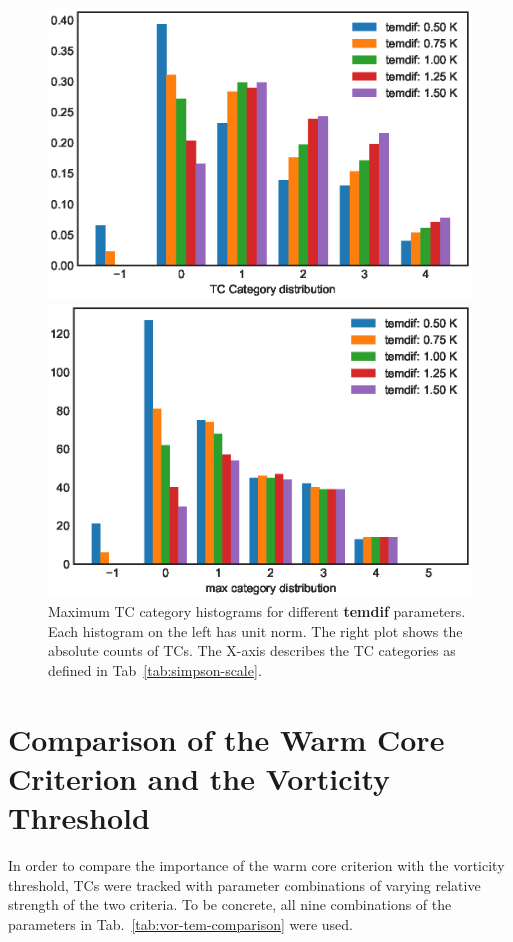 \begin{figure}[ht]
	\begin{minipage}[t]{0.48\textwidth}
		\includegraphics[width = \textwidth]{img/max_cat_distr_temdifs.eps}
	\end{minipage}
	\hfill
	\begin{minipage}[t]{0.48\textwidth}
		\includegraphics[width = \textwidth]{img/max_cat_counts_temdifs.eps}
	\end{minipage}
	\caption{Maximum TC category histograms for different \textbf{temdif} parameters. Each histogram on the left has unit norm. The right plot shows the absolute counts of TCs. The X-axis describes the TC categories as defined in Tab~\ref{tab:simpson-scale}.}
	\label{fig:temdif-analysis}
\end{figure}


\section{Comparison of the Warm Core Criterion and the Vorticity Threshold}\label{sec:warmcore-var}
In order to compare the importance of the warm core criterion with the vorticity threshold, TCs were tracked with parameter combinations of varying relative strength of the two criteria. To be concrete, all nine combinations of the parameters in Tab.~\ref{tab:vor-tem-comparison} were used.

